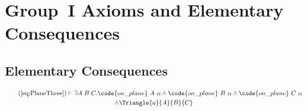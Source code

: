 \chapter{Group~I Axioms and Elementary Consequences}\label{app:group1}

\section{Elementary Consequences}
\begin{multline}
  \tag{\ref{eq:PlaneThree}}
  \vdash\exists A\;B\;C. \code{on\_plane}\ A\ \alpha\wedge\code{on\_plane}\ B\ \alpha\wedge\code{on\_plane}\ C\ \alpha\\
  \wedge \Triangle{a}{A}{B}{C}
\end{multline}

